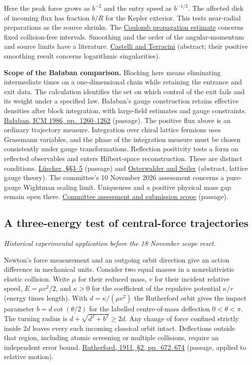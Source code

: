 \documentclass[11pt,a4paper]{article}
\begin{document}
Here the peak force grows as \(b^{-2}\) and the entry speed as
\(b^{-1/2}\). The affected disk of incoming flux has fraction \(b/R\)
for the Kepler exterior. This tests near-radial preparations as the
source shrinks. The \href{self-sufficiency-contrast.md}{Coulomb
propagation estimate} concerns fixed collision-free intervals. Smoothing
and the order of the angular-momentum and source limits have a
literature. \href{https://arxiv.org/abs/0905.1579}{Castelli and
Terracini} (abstract; their positive smoothing result concerns
logarithmic singularities).

\textbf{Scope of the Bałaban comparison.} Blocking here means
eliminating intermediate times on a one-dimensional chain while
retaining the entrance and exit data. The calculation identifies the set
on which control of the exit fails and its weight under a specified law.
Bałaban's gauge construction retains effective densities after block
integration, with large-field estimates and gauge constraints.
\href{../docs/balaban/Balaban_UltravioletStability_ICM1986_1987.md}{Bałaban,
ICM 1986, pp.~1260--1262} (passage). The positive flux above is an
ordinary trajectory measure. Integration over chiral lattice fermions
uses Grassmann variables, and the phase of the integration measure must
be chosen consistently under gauge transformations. Reflection
positivity tests a form on reflected observables and enters
Hilbert-space reconstruction. These are distinct conditions.
\href{https://arxiv.org/pdf/hep-lat/9904009}{Lüscher, §§3--5} (passage)
and \href{https://doi.org/10.1016/0003-4916(78)90039-8}{Osterwalder and
Seiler} (abstract, lattice gauge theory). The committee's 10 November
2026 assessment concerns a pure-gauge Wightman scaling limit. Uniqueness
and a positive physical mass gap remain open there.
\href{https://github.com/yang-mills-group/YM}{Committee assessment and
submission scope} (passage).

\subsection{A three-energy test of central-force
trajectories}\label{a-three-energy-test-of-central-force-trajectories}

\emph{Historical experimental application before the 18 November scope
reset.}

Newton's force measurement and an outgoing orbit direction give an
action difference in mechanical units. Consider two equal masses in a
nonrelativistic elastic collision. Write \(\mu\) for their reduced mass,
\(v\) for their incident relative speed, \(E=\mu v^2/2\), and
\(\kappa>0\) for the coefficient of the repulsive potential \(\kappa/r\)
(energy times length). With \(d=\kappa/(\mu v^2)\) the Rutherford orbit
gives the impact parameter \(b=d\cot(\theta/2)\) for the labelled
centre-of-mass deflection \(0<\theta<\pi\). The turning radius is
\(d+\sqrt{d^2+b^2}\ge 2d\). Any change of force confined strictly inside
\(2d\) leaves every such incoming classical orbit intact. Deflections
outside that region, including atomic screening or multiple collisions,
require an independent error bound.
\href{https://www.physics.utoronto.ca/~phy326/cc/Rutherford1911.pdf}{Rutherford,
1911, §2, pp.~672--674} (passage, applied to relative motion).
\end{document}

